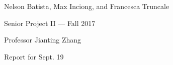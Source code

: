 \documentclass{article}
\begin{document}
\noindent Nelson Batista, Max Inciong, and Francesca Truncale

\noindent Senior Project II --- Fall 2017

\noindent Professor Jianting Zhang

\noindent Report for Sept. 19
\end{document}
